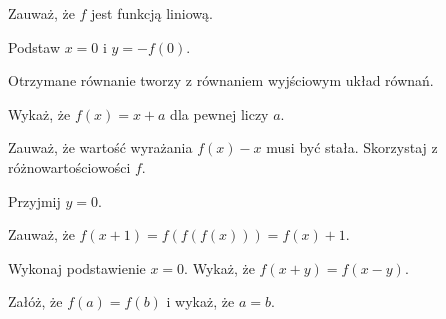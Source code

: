 
\begin{hints_list}
	\item *
	\item Zauważ, że $f$ jest funkcją liniową.
	\item Podstaw $x = 0$ i $y = - f(0)$.
	\item Otrzymane równanie tworzy z równaniem wyjściowym układ równań.
	\item Wykaż, że $f(x) = x + a$ dla pewnej liczy $a$.
	\item Zauważ, że wartość wyrażania $f(x) - x$ musi być stała. Skorzystaj z różnowartościowości $f$.
	\item Przyjmij $y = 0$.
	\item Zauważ, że $f(x + 1) = f(f(f(x))) = f(x) + 1$.
	\item Wykonaj podstawienie $x = 0$. Wykaż, że $f(x + y) = f(x - y)$.
	\item Załóż, że $f(a) = f(b)$ i wykaż, że $a = b$.
\end{hints_list}